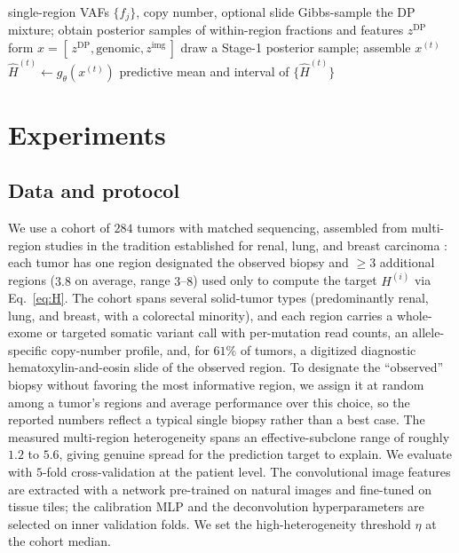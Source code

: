 \documentclass{article}
\begin{document}
\begin{algorithm}[t]
\caption{One-shot heterogeneity estimation}
\label{alg:oneshot}
\begin{algorithmic}
 single-region VAFs $\{f_j\}$, copy number, optional slide
 Gibbs-sample the DP mixture; obtain posterior samples of
within-region fractions and features $z^{\text{DP}}$
 form $x = [\,z^{\text{DP}}, \text{genomic}, z^{\text{img}}\,]$
\STATE draw a Stage-1 posterior sample; assemble $x^{(t)}$
\STATE $\hat H^{(t)} \leftarrow g_\theta(x^{(t)})$
\ENDFOR
{} predictive mean and interval of $\{\hat H^{(t)}\}$
\end{algorithmic}
\end{algorithm}

\section{Experiments}
\label{sec:results}

\subsection{Data and protocol}

We use a cohort of $284$ tumors with matched sequencing, assembled from multi-region
studies in the tradition established for renal, lung, and breast carcinoma
\citep{Gerlinger2012,deBruin2014,Yates2015}: each tumor has one region designated the
observed biopsy and $\geq 3$ additional regions ($3.8$ on average, range $3$--$8$)
used only to compute the target $H^{(i)}$ via Eq.~\eqref{eq:H}. The cohort spans
several solid-tumor types (predominantly renal, lung, and breast, with a colorectal
minority), and each region carries a whole-exome or targeted somatic variant call
with per-mutation read counts, an allele-specific copy-number profile, and, for
$61\%$ of tumors, a digitized diagnostic hematoxylin-and-eosin slide of the observed
region. To designate the ``observed'' biopsy without favoring the most informative
region, we assign it at random among a tumor's regions and average performance over
this choice, so the reported numbers reflect a typical single biopsy rather than a
best case. The measured multi-region heterogeneity spans an effective-subclone range
of roughly $1.2$ to $5.6$, giving genuine spread for the prediction target to explain.
We evaluate with $5$-fold cross-validation at the patient level. The convolutional
image features are extracted with a network pre-trained on natural images and
fine-tuned on tissue tiles; the calibration MLP and the deconvolution hyperparameters
are selected on inner validation folds. We set the high-heterogeneity threshold $\eta$
at the cohort median.
\end{document}
